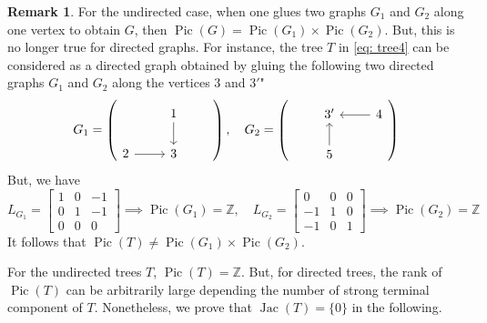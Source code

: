 \documentclass[11pt,reqno]{amsart}
\DeclareMathOperator{\Pic}{Pic}
\DeclareMathOperator{\Jac}{Jac}
\theoremstyle{definition}
\newtheorem{rmk}[mydef]{Remark}
\theoremstyle{plain}
\begin{document}
\begin{rmk}
For the undirected case, when one glues two graphs $G_1$ and $G_2$ along one vertex to obtain $G$, then $\Pic(G)=\Pic(G_1) \times \Pic(G_2)$. But, this is no longer true for directed graphs. For instance, the tree $T$ in \eqref{eq: tree4} can be considered as a directed graph obtained by gluing the following two directed graphs $G_1$ and $G_2$ along the vertices $3$ and $3'$"
\begin{equation}
G_1=\left(\begin{tikzcd}
	& 1 \arrow[d] & \\
	2 \arrow[r]& 3 
\end{tikzcd} \right), \quad G_2=\left(\begin{tikzcd}
& 3' & 4 \arrow[l]\\
& 5 \arrow[u] &
\end{tikzcd} \right)
\end{equation}
But, we have
\[
L_{G_1}=\begin{bmatrix}
	1 & 0 &-1\\
	0 & 1 & -1\\
	0& 0 & 0
\end{bmatrix} \implies \Pic(G_1)=\mathbb{Z}, \quad L_{G_2}=\begin{bmatrix}
0 & 0 &0\\
-1 & 1 & 0\\
-1& 0 & 1
\end{bmatrix} \implies \Pic(G_2)=\mathbb{Z}
\]
It follows that $\Pic(T) \neq \Pic(G_1) \times \Pic(G_2)$.
\end{rmk}

For the undirected trees $T$, $\Pic(T)=\mathbb{Z}$. But, for directed trees, the rank of $\Pic(T)$ can be arbitrarily large depending the number of strong terminal component of $T$. Nonetheless, we prove that $\Jac(T)=\{0\}$ in the following. 
\end{document}
